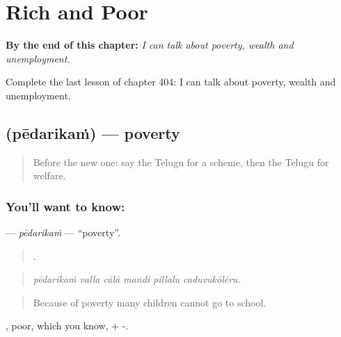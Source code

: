 
\chapter{Rich and Poor}
\label{ch:te-rich-and-poor}

\begin{chapteropening}
\textbf{By the end of this chapter:} \emph{I can talk about poverty, wealth and unemployment.}

Complete the last lesson of chapter 404: I can talk about poverty, wealth and unemployment.
\end{chapteropening}

\section[\texorpdfstring{\te{పేదరికం} (pēdarikaṁ)}{పేదరికం (pēdarikaṁ)}]{ (pēdarikaṁ) — poverty}

\label{lesson:TE-C404-pedarikam}



\begin{quote}
Before the new one: say the Telugu for a scheme, then the Telugu for welfare.
\end{quote}

\subsection*{You'll want to know: }
\textbf{} — \emph{pēdarikaṁ} — \textquotedblleft{}poverty\textquotedblright{}.

\begin{quote}
     .
\end{quote}

\begin{quote}
\emph{pēdarikaṁ valla cālā mandi pillalu caduvukōlēru.}
\end{quote}

\begin{quote}
Because of poverty many children cannot go to school.
\end{quote}

, poor, which you know, + -.

